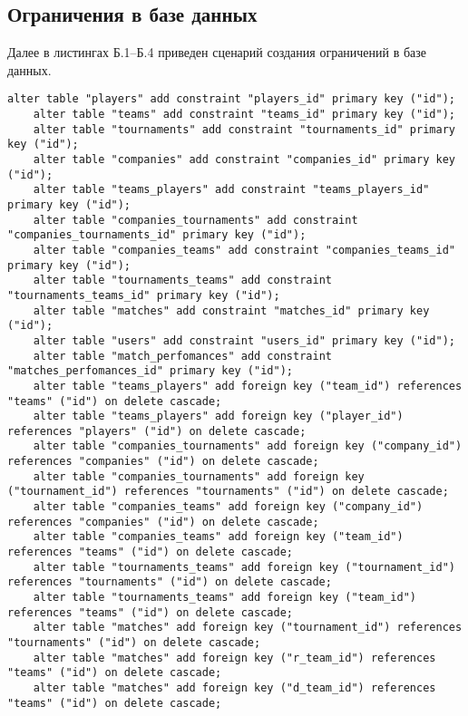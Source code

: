 \begin{appendices}
\chapter{Ограничения в базе данных}

Далее в листингах Б.1--Б.4 приведен сценарий создания ограничений в базе данных. 

\begin{lstlisting}[caption={Сценарий создания ограничений в базе данных (часть 1)}]
	alter table "players" add constraint "players_id" primary key ("id"); 
	alter table "teams" add constraint "teams_id" primary key ("id");
	alter table "tournaments" add constraint "tournaments_id" primary key ("id");
	alter table "companies" add constraint "companies_id" primary key ("id");
	alter table "teams_players" add constraint "teams_players_id" primary key ("id");
	alter table "companies_tournaments" add constraint "companies_tournaments_id" primary key ("id");
	alter table "companies_teams" add constraint "companies_teams_id" primary key ("id");
	alter table "tournaments_teams" add constraint "tournaments_teams_id" primary key ("id");
	alter table "matches" add constraint "matches_id" primary key ("id");
	alter table "users" add constraint "users_id" primary key ("id");
	alter table "match_perfomances" add constraint "matches_perfomances_id" primary key ("id");
	alter table "teams_players" add foreign key ("team_id") references "teams" ("id") on delete cascade;
	alter table "teams_players" add foreign key ("player_id") references "players" ("id") on delete cascade;
	alter table "companies_tournaments" add foreign key ("company_id") references "companies" ("id") on delete cascade;
	alter table "companies_tournaments" add foreign key ("tournament_id") references "tournaments" ("id") on delete cascade;
	alter table "companies_teams" add foreign key ("company_id") references "companies" ("id") on delete cascade;
	alter table "companies_teams" add foreign key ("team_id") references "teams" ("id") on delete cascade;
	alter table "tournaments_teams" add foreign key ("tournament_id") references "tournaments" ("id") on delete cascade;
	alter table "tournaments_teams" add foreign key ("team_id") references "teams" ("id") on delete cascade;
	alter table "matches" add foreign key ("tournament_id") references "tournaments" ("id") on delete cascade;
	alter table "matches" add foreign key ("r_team_id") references "teams" ("id") on delete cascade;
	alter table "matches" add foreign key ("d_team_id") references "teams" ("id") on delete cascade;
\end{lstlisting}


\end{appendices}
